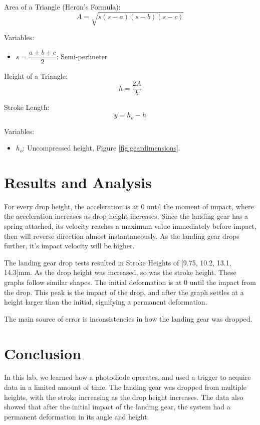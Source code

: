 \documentclass{article}
\begin{document}
Area of a Triangle (Heron's Formula):
\begin{equation}
    A = \sqrt{s(s-a)(s-b)(s-c)}
\end{equation}

Variables:
\begin{itemize}
    \item \(s = \dfrac{a+b+c}{2}\): Semi-perimeter
\end{itemize}
\vspace{5mm}

Height of a Triangle:
\begin{equation}
    h = \dfrac{2A}{b}
\end{equation}

Stroke Length:
\begin{equation}
    y = h_{o} - h
\end{equation}

Variables:
\begin{itemize}
    \item \(h_{o}\): Uncompressed height, Figure \ref{fig:geardimensions}. 
\end{itemize}
\vspace{5mm}
\section{Results and Analysis}
For every drop height, the acceleration is at 0 until the moment of impact, where the acceleration increases as drop height increases. Since the landing gear has a spring attached, its velocity reaches a maximum value immediately before impact, then will reverse direction almost instantaneously. As the landing gear drops further, it's impact velocity will be higher.  

The landing gear drop tests resulted in Stroke Heights of [9.75, 10.2, 13.1, 14.3]mm.  As the drop height was increased, so was the stroke height.  These graphs follow similar shapes.  The initial deformation is at 0 until the impact from the drop. This peak is the impact of the drop, and after the graph settles at a height larger than the initial, signifying a permanent deformation.  

The main source of error is inconsistencies in how the landing gear was dropped.
 
\section{Conclusion}
In this lab, we learned how a photodiode operates, and used a trigger to acquire data in a limited amount of time.  The landing gear was dropped from multiple heights, with the stroke increasing as the drop height increases.  The data also showed that after the initial impact of the landing gear, the system had a permanent deformation in its angle and height.  
\end{document}
